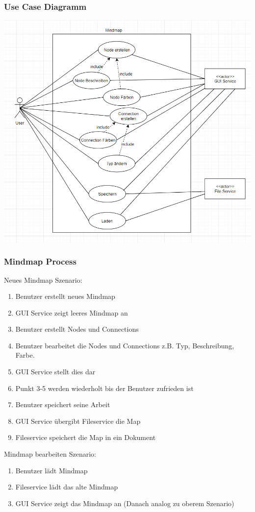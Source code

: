 \documentclass[a4paper,parskip]{scrartcl}
\begin{document}
\subsubsection{Use Case Diagramm}
\includegraphics[width=\linewidth]{UseCaseDiagram.PNG}

\subsubsection{Mindmap Process}
Neues Mindmap Szenario:
\begin{enumerate}
\item Benutzer erstellt neues Mindmap
\item GUI Service zeigt leeres Mindmap an
\item Benutzer erstellt Nodes und Connections 
\item Benutzer bearbeitet die Nodes und Connections z.B. Typ, Beschreibung, Farbe.
\item GUI Service stellt dies dar
\item Punkt 3-5 werden wiederholt bis der Benutzer zufrieden ist
\item Benutzer speichert seine Arbeit
\item GUI Service übergibt Fileservice die Map
\item Fileservice speichert die Map in ein Dokument
\end{enumerate}

Mindmap bearbeiten Szenario: 
\begin{enumerate}
\item Benutzer lädt Mindmap
\item Fileservice lädt das alte Mindmap
\item GUI Service zeigt das Mindmap an (Danach analog zu oberem Szenario)
\end{enumerate}
\end{document}
